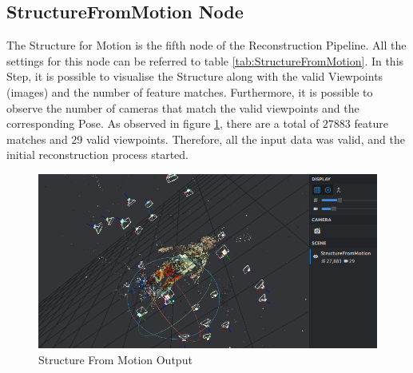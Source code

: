 \documentclass[12pt]{report}
\begin{document}
\subsection*{StructureFromMotion Node}
The Structure for Motion is the fifth node of the Reconstruction Pipeline. All the settings for this node can be referred to table \ref{tab:StructureFromMotion}.
In this Step, it is possible to visualise the Structure along with the valid Viewpoints (images) and the number of feature matches. Furthermore, it is possible to observe
the number of cameras that match the valid viewpoints and the corresponding Pose. As observed in figure \ref{fig:SFM_output}, there are a total of $27883$ feature matches and $29$ valid viewpoints.
Therefore, all the input data was valid, and the initial reconstruction process started. 

\begin{figure}[H]%
  \centering
 \includegraphics[width=1\textwidth]{SFM_example.png}
\caption{Structure From Motion Output}
\label{fig:SFM_output} 
\end{figure}
\end{document}
